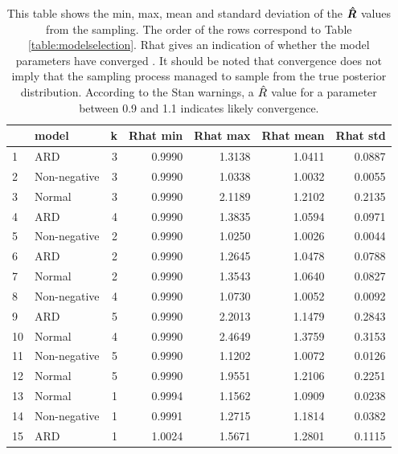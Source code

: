\documentclass[12pt]{article}
\begin{document}
    \begin{table}[H]
        \centering
        \caption{This table shows the min, max, mean and standard deviation of the $\boldsymbol{\hat{R}}$ values from the sampling. The order of the rows correspond to Table \ref{table:modelselection}. Rhat gives an indication of whether the model parameters have converged \cite{Rhat}. It should be noted that convergence does not imply that the sampling process managed to sample from the true posterior distribution. According to the Stan warnings, a $\hat{R}$ value for a parameter between 0.9 and 1.1 indicates likely convergence.}
        \label{table:rhats}
        \begin{tabular}{llr|rr|rr}
            \toprule
            {} &         model &  k &  Rhat min &  Rhat max &  Rhat mean &  Rhat std \\
            \midrule
            1  &           ARD &  3 &    0.9990 &    1.3138 &     1.0411 &    0.0887 \\
            2  &  Non-negative &  3 &    0.9990 &    1.0338 &     1.0032 &    0.0055 \\
            3  &        Normal &  3 &    0.9990 &    2.1189 &     1.2102 &    0.2135 \\
            4  &           ARD &  4 &    0.9990 &    1.3835 &     1.0594 &    0.0971 \\
            5  &  Non-negative &  2 &    0.9990 &    1.0250 &     1.0026 &    0.0044 \\
            6  &           ARD &  2 &    0.9990 &    1.2645 &     1.0478 &    0.0788 \\
            7  &        Normal &  2 &    0.9990 &    1.3543 &     1.0640 &    0.0827 \\
            8  &  Non-negative &  4 &    0.9990 &    1.0730 &     1.0052 &    0.0092 \\
            9  &           ARD &  5 &    0.9990 &    2.2013 &     1.1479 &    0.2843 \\
            10 &        Normal &  4 &    0.9990 &    2.4649 &     1.3759 &    0.3153 \\
            11 &  Non-negative &  5 &    0.9990 &    1.1202 &     1.0072 &    0.0126 \\
            12 &        Normal &  5 &    0.9990 &    1.9551 &     1.2106 &    0.2251 \\
            13 &        Normal &  1 &    0.9994 &    1.1562 &     1.0909 &    0.0238 \\
            14 &  Non-negative &  1 &    0.9991 &    1.2715 &     1.1814 &    0.0382 \\
            15 &           ARD &  1 &    1.0024 &    1.5671 &     1.2801 &    0.1115 \\
            \bottomrule
        \end{tabular}
    \end{table}
\end{document}
